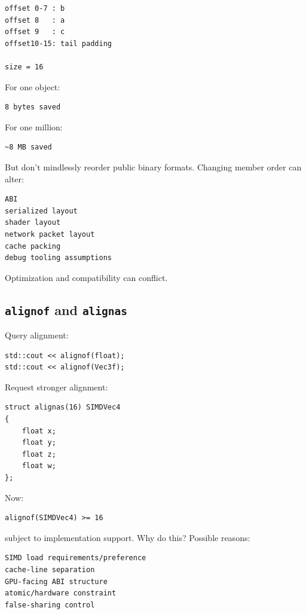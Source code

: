 \begin{verbatim}
offset 0-7 : b
offset 8   : a
offset 9   : c
offset10-15: tail padding

size = 16
\end{verbatim}

For one object:

\begin{verbatim}
8 bytes saved
\end{verbatim}

For one million:

\begin{verbatim}
~8 MB saved
\end{verbatim}

But don't mindlessly reorder public binary formats. Changing member order can alter:

\begin{verbatim}
ABI
serialized layout
shader layout
network packet layout
cache packing
debug tooling assumptions
\end{verbatim}

Optimization and compatibility can conflict.

\subsection{\texorpdfstring{\texttt{alignof} and \texttt{alignas}}{alignof and alignas}}\label{01-foundations-i-ch003-alignof-and-alignas}

\hypertarget{01-foundations-i-ch003-alignof-and-alignas}{}

Query alignment:

\begin{verbatim}
std::cout << alignof(float);
std::cout << alignof(Vec3f);
\end{verbatim}

Request stronger alignment:

\begin{verbatim}
struct alignas(16) SIMDVec4
{
    float x;
    float y;
    float z;
    float w;
};
\end{verbatim}

Now:

\begin{verbatim}
alignof(SIMDVec4) >= 16
\end{verbatim}

subject to implementation support. Why do this? Possible reasons:

\begin{verbatim}
SIMD load requirements/preference
cache-line separation
GPU-facing ABI structure
atomic/hardware constraint
false-sharing control
\end{verbatim}


